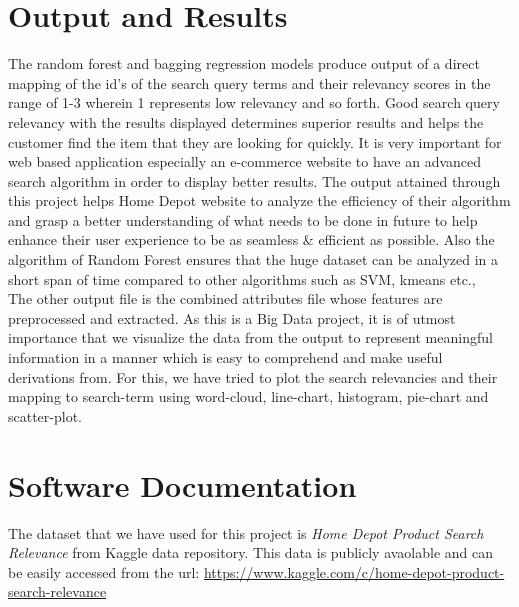 \documentclass{sig-alternate-05-2015}
\begin{document}
\section{Output and Results}
The random forest and bagging regression models produce output of a direct mapping of the id's of the search query terms and their relevancy scores in the range of 1-3 wherein 1 represents low relevancy and so forth. Good search query relevancy with the results displayed determines superior results and helps the customer find the item that they are looking for quickly. It is very important for web based application especially an e-commerce website to have an advanced search algorithm in order to display better results. The output attained through this project helps Home Depot website to analyze the efficiency of their algorithm and grasp a better understanding of what needs to be done in future to help enhance their user experience to be as seamless & efficient as possible. Also the algorithm of Random Forest ensures that the huge dataset can be analyzed in a short span of time compared to other algorithms such as SVM, kmeans etc.,\\
The other output file is the combined attributes file whose features are preprocessed and extracted. As this is a Big Data project, it is of utmost importance that we visualize the data from the output to represent meaningful information in a manner which is easy to comprehend and make useful derivations from. For this, we have tried to plot the search relevancies and their mapping to search-term using word-cloud, line-chart, histogram, pie-chart and scatter-plot. 
\newline

\section{Software Documentation}
The dataset that we have used for this project is {\itshape Home Depot Product Search Relevance} from Kaggle data repository. This data is publicly avaolable and can be easily accessed from the url: \newline 
\url                    {https://www.kaggle.com/c/home-depot-product-search-relevance}
\newline 
\end{document}
